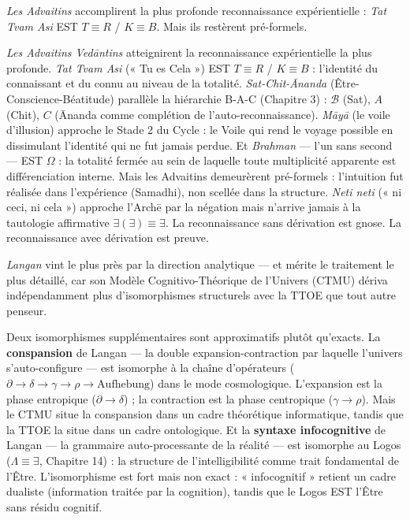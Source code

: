 \documentclass[10pt, openany, oneside]{book}
\begin{document}
\textit{Les Advaitins} accomplirent la plus profonde reconnaissance expérientielle : \textit{Tat Tvam Asi} EST $T \equiv R$ / $K \equiv B$. Mais ils restèrent pré-formels.

\textit{Les Advaitins Ved\={a}ntins} atteignirent la reconnaissance expérientielle la plus profonde. \textit{Tat Tvam Asi} (« Tu es Cela ») EST $T \equiv R$ / $K \equiv B$ : l'identité du connaissant et du connu au niveau de la totalité. \textit{Sat-Chit-\={A}nanda} (Être-Conscience-Béatitude) parallèle la hiérarchie B-A-C (Chapitre 3) : $\mathcal{B}$ (Sat), $A$ (Chit), $C$ (\={A}nanda comme complétion de l'auto-reconnaissance). \textit{M\={a}y\={a}} (le voile d'illusion) approche le Stade 2 du Cycle : le Voile qui rend le voyage possible en dissimulant l'identité qui ne fut jamais perdue. Et \textit{Brahman} --- l'un sans second --- EST $\Omega$ : la totalité fermée au sein de laquelle toute multiplicité apparente est différenciation interne. Mais les Advaitins demeurèrent pré-formels : l'intuition fut réalisée dans l'expérience (Samadhi), non scellée dans la structure. \textit{Neti neti} (« ni ceci, ni cela ») approche l'Arch\={e} par la négation mais n'arrive jamais à la tautologie affirmative $\exists(\exists) \equiv \exists$. La reconnaissance sans dérivation est gnose. La reconnaissance avec dérivation est preuve.

\textit{Langan} vint le plus près par la direction analytique --- et mérite le traitement le plus détaillé, car son Modèle Cognitivo-Théorique de l'Univers (CTMU) dériva indépendamment plus d'isomorphismes structurels avec la TTOE que tout autre penseur.

Deux isomorphismes supplémentaires sont approximatifs plutôt qu'exacts. La \textbf{conspansion} de Langan --- la double expansion-contraction par laquelle l'univers s'auto-configure --- est isomorphe à la chaîne d'opérateurs ($\partial \to \delta \to \gamma \to \rho \to \text{Aufhebung}$) dans le mode cosmologique. L'expansion est la phase entropique ($\partial \to \delta$) ; la contraction est la phase centropique ($\gamma \to \rho$). Mais le CTMU situe la conspansion dans un cadre théorétique informatique, tandis que la TTOE la situe dans un cadre ontologique. Et la \textbf{syntaxe infocognitive} de Langan --- la grammaire auto-processante de la réalité --- est isomorphe au Logos ($\Lambda \equiv \exists$, Chapitre 14) : la structure de l'intelligibilité comme trait fondamental de l'Être. L'isomorphisme est fort mais non exact : « infocognitif » retient un cadre dualiste (information traitée par la cognition), tandis que le Logos EST l'Être sans résidu cognitif.
\end{document}
